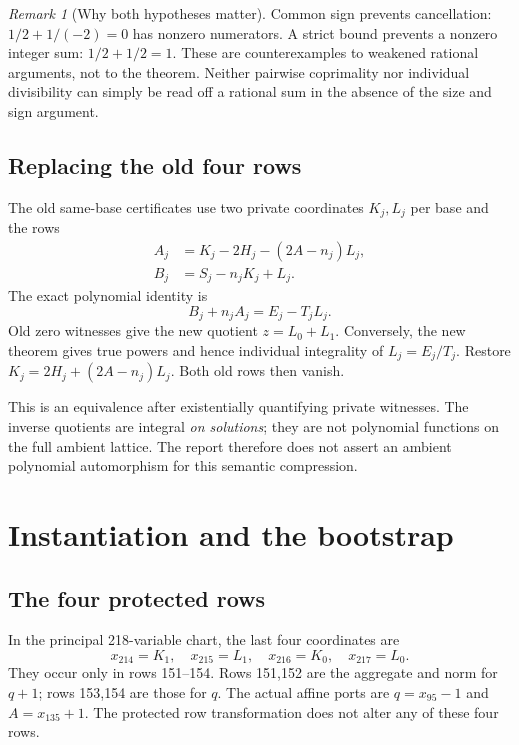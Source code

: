 \documentclass[11pt,letterpaper]{article}
\theoremstyle{definition}\newtheorem{definition}[theorem]{Definition}
\theoremstyle{remark}\newtheorem{remark}[theorem]{Remark}
\begin{document}
\begin{remark}[Why both hypotheses matter]
Common sign prevents cancellation: $1/2+1/(-2)=0$ has nonzero
numerators. A strict bound prevents a nonzero integer sum:
$1/2+1/2=1$. These are counterexamples to weakened rational arguments,
not to the theorem. Neither pairwise coprimality nor individual
divisibility can simply be read off a rational sum in the absence of
the size and sign argument.
\end{remark}

\subsection{Replacing the old four rows}

The old same-base certificates use two private coordinates $K_j,L_j$
per base and the rows
\begin{align}
 A_j&=K_j-2H_j-(2A-n_j)L_j,\label{eq:oldA}\\
 B_j&=S_j-n_jK_j+L_j.\label{eq:oldB}
\end{align}
The exact polynomial identity is
\begin{equation}\label{eq:eliminate}
 B_j+n_jA_j=E_j-T_jL_j.
\end{equation}
Old zero witnesses give the new quotient $z=L_0+L_1$. Conversely, the
new theorem gives true powers and hence individual integrality of
$L_j=E_j/T_j$. Restore
$K_j=2H_j+(2A-n_j)L_j$. Both old rows then vanish.

This is an equivalence after existentially quantifying private witnesses.
The inverse quotients are integral \emph{on solutions}; they are not
polynomial functions on the full ambient lattice. The report therefore
does not assert an ambient polynomial automorphism for this semantic
compression.

\section{Instantiation and the bootstrap}

\subsection{The four protected rows}

In the principal 218-variable chart, the last four coordinates are
\[
 x_{214}=K_1,\quad x_{215}=L_1,\quad
 x_{216}=K_0,\quad x_{217}=L_0.
\]
They occur only in rows 151--154. Rows 151,152 are the aggregate and
norm for $q+1$; rows 153,154 are those for $q$. The actual affine ports
are $q=x_{95}-1$ and $A=x_{135}+1$. The protected row transformation
does not alter any of these four rows.
\end{document}
